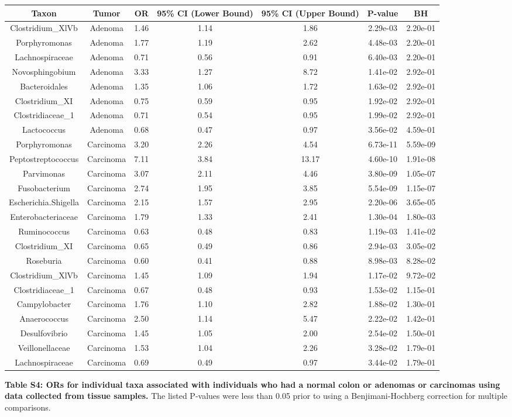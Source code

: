 \documentclass[12pt,]{article}
\begin{document}
\begin{longtable}[]{@{}ccccccc@{}}
\toprule
Taxon & Tumor & OR & 95\% CI (Lower Bound) & 95\% CI (Upper Bound) &
P-value & BH\tabularnewline
\midrule
\endhead
Clostridium\_XlVb & Adenoma & 1.46 & 1.14 & 1.86 & 2.29e-03 &
2.20e-01\tabularnewline
Porphyromonas & Adenoma & 1.77 & 1.19 & 2.62 & 4.48e-03 &
2.20e-01\tabularnewline
Lachnospiraceae & Adenoma & 0.71 & 0.56 & 0.91 & 6.40e-03 &
2.20e-01\tabularnewline
Novosphingobium & Adenoma & 3.33 & 1.27 & 8.72 & 1.41e-02 &
2.92e-01\tabularnewline
Bacteroidales & Adenoma & 1.35 & 1.06 & 1.72 & 1.63e-02 &
2.92e-01\tabularnewline
Clostridium\_XI & Adenoma & 0.75 & 0.59 & 0.95 & 1.92e-02 &
2.92e-01\tabularnewline
Clostridiaceae\_1 & Adenoma & 0.71 & 0.54 & 0.95 & 1.99e-02 &
2.92e-01\tabularnewline
Lactococcus & Adenoma & 0.68 & 0.47 & 0.97 & 3.56e-02 &
4.59e-01\tabularnewline
Porphyromonas & Carcinoma & 3.20 & 2.26 & 4.54 & 6.73e-11 &
5.59e-09\tabularnewline
Peptostreptococcus & Carcinoma & 7.11 & 3.84 & 13.17 & 4.60e-10 &
1.91e-08\tabularnewline
Parvimonas & Carcinoma & 3.07 & 2.11 & 4.46 & 3.80e-09 &
1.05e-07\tabularnewline
Fusobacterium & Carcinoma & 2.74 & 1.95 & 3.85 & 5.54e-09 &
1.15e-07\tabularnewline
Escherichia.Shigella & Carcinoma & 2.15 & 1.57 & 2.95 & 2.20e-06 &
3.65e-05\tabularnewline
Enterobacteriaceae & Carcinoma & 1.79 & 1.33 & 2.41 & 1.30e-04 &
1.80e-03\tabularnewline
Ruminococcus & Carcinoma & 0.63 & 0.48 & 0.83 & 1.19e-03 &
1.41e-02\tabularnewline
Clostridium\_XI & Carcinoma & 0.65 & 0.49 & 0.86 & 2.94e-03 &
3.05e-02\tabularnewline
Roseburia & Carcinoma & 0.60 & 0.41 & 0.88 & 8.98e-03 &
8.28e-02\tabularnewline
Clostridium\_XlVb & Carcinoma & 1.45 & 1.09 & 1.94 & 1.17e-02 &
9.72e-02\tabularnewline
Clostridiaceae\_1 & Carcinoma & 0.67 & 0.48 & 0.93 & 1.53e-02 &
1.15e-01\tabularnewline
Campylobacter & Carcinoma & 1.76 & 1.10 & 2.82 & 1.88e-02 &
1.30e-01\tabularnewline
Anaerococcus & Carcinoma & 2.50 & 1.14 & 5.47 & 2.22e-02 &
1.42e-01\tabularnewline
Desulfovibrio & Carcinoma & 1.45 & 1.05 & 2.00 & 2.54e-02 &
1.50e-01\tabularnewline
Veillonellaceae & Carcinoma & 1.53 & 1.04 & 2.26 & 3.28e-02 &
1.79e-01\tabularnewline
Lachnospiraceae & Carcinoma & 0.69 & 0.49 & 0.97 & 3.44e-02 &
1.79e-01\tabularnewline
\bottomrule
\end{longtable}

\normalsize

\newpage

\textbf{Table S4: ORs for individual taxa associated with individuals
who had a normal colon or adenomas or carcinomas using data collected
from tissue samples.} The listed P-values were less than 0.05 prior to
using a Benjimani-Hochberg correction for multiple comparisons.
\end{document}
